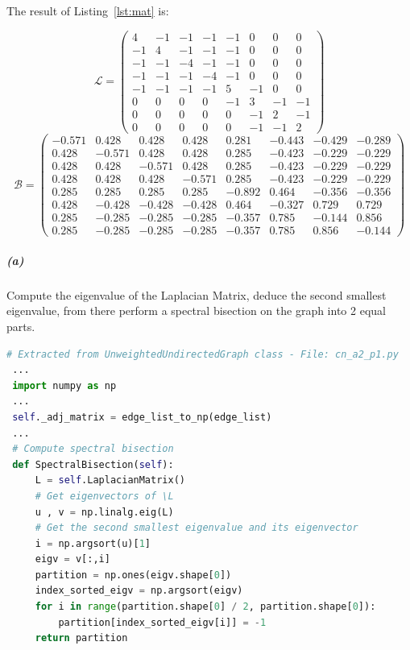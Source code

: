 \documentclass[a4paper,12pt]{article}
\begin{document}
\noindent
The result of Listing~\ref{lst:mat} is:

\[ \mathcal{L} = \left( \begin{array}{cccccccc}
4 & -1 & -1 & -1 & -1 & 0 & 0 & 0 \\
-1 & 4 & -1 & -1 & -1 & 0 & 0 & 0 \\
-1 & -1 & -4 & -1 & -1 & 0 & 0 & 0 \\
-1 & -1 & -1 & -4 & -1 & 0 & 0 & 0 \\
-1 & -1 & -1 & -1 & 5 & -1 & 0 & 0 \\
0 & 0 & 0 & 0 & -1 & 3 & -1 & -1 \\
0 & 0 & 0 & 0 & 0 & -1 & 2 & -1 \\
0 & 0 & 0 & 0 & 0 & -1 & -1 & 2 \end{array} \right) \]
\[ \mathcal{B} = \left( \begin{array}{cccccccc}
-0.571 & 0.428 & 0.428 & 0.428 & 0.281 & -0.443 & -0.429 & -0.289 \\
0.428 & -0.571 &  0.428 &  0.428 &  0.285 & -0.423 & -0.229 & -0.229 \\
0.428 &  0.428 & -0.571 &  0.428 &  0.285 & -0.423 & -0.229 & -0.229 \\
0.428 &  0.428 &  0.428 & -0.571 &  0.285 & -0.423 & -0.229 & -0.229 \\
0.285 &  0.285 &  0.285 &  0.285 & -0.892 & 0.464 & -0.356 & -0.356 \\
0.428 & -0.428 & -0.428 & -0.428 &  0.464 & -0.327 &  0.729 &  0.729 \\
0.285 & -0.285 & -0.285 & -0.285 & -0.357 & 0.785 & -0.144 &  0.856 \\
0.285 & -0.285 & -0.285 & -0.285 & -0.357 & 0.785 &  0.856 & -0.144 \end{array} \right)\]

\subparagraph{(a)} Compute the eigenvalue of the Laplacian Matrix, deduce the second smallest eigenvalue, from there perform a spectral bisection on the graph into 2 equal parts.

\begin{lstlisting}[language=Python, caption={Perform Spectral Bisection on the graph}, label={lst:bisec}]
 # Extracted from UnweightedUndirectedGraph class - File: cn_a2_p1.py
 ...
 import numpy as np
 ...
 self._adj_matrix = edge_list_to_np(edge_list)
 ...
 # Compute spectral bisection
 def SpectralBisection(self):
     L = self.LaplacianMatrix()
     # Get eigenvectors of \L
     u , v = np.linalg.eig(L)
     # Get the second smallest eigenvalue and its eigenvector
     i = np.argsort(u)[1]
     eigv = v[:,i]
     partition = np.ones(eigv.shape[0])
     index_sorted_eigv = np.argsort(eigv)
     for i in range(partition.shape[0] / 2, partition.shape[0]):
         partition[index_sorted_eigv[i]] = -1
     return partition
\end{lstlisting}
\end{document}
